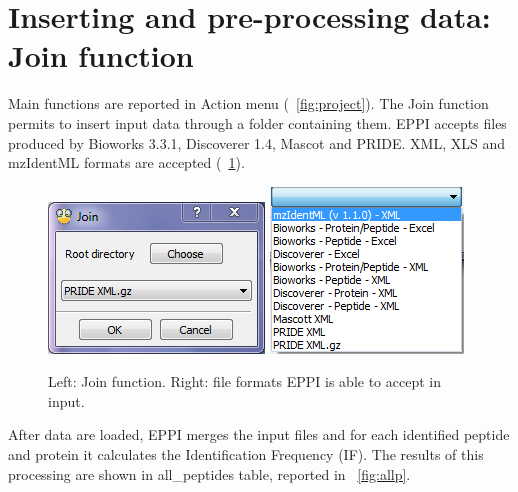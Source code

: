 \documentclass[a4paper,14pt]{extarticle}
\begin{document}
 

\section{Inserting and pre-processing data: Join function}

Main functions are reported in Action menu (\figurename~\ref{fig:project}).
The Join function permits to insert input data through a folder containing them. EPPI accepts files produced by Bioworks 3.3.1, Discoverer 1.4, Mascot and PRIDE. XML, XLS and mzIdentML formats are accepted (\figurename~\ref{fig:join}). 

\begin{figure}[htbp]
\begin{center}
\includegraphics[scale=0.8]{EPPI_join}%
\hspace{5mm}
\includegraphics[scale=0.8]{formatFile}
\caption{Left: Join function. Right: file formats EPPI is able to accept in input.}\label{fig:join}
\end{center}
\end{figure}

After data are loaded, EPPI merges the input files and for each identified peptide and protein it calculates the Identification Frequency (IF). The results of this processing are shown in all\_peptides table, reported in \figurename~\ref{fig:allp}.
\end{document}
